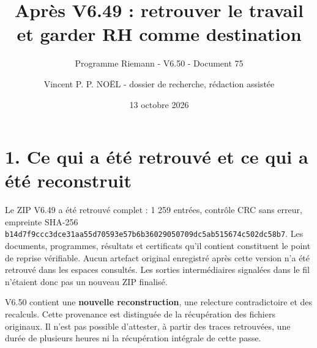 \documentclass[
  10pt,
  a4paper,
]{article}
\title{Après V6.49 : retrouver le travail et garder RH comme
destination}
\subtitle{Programme Riemann - V6.50 - Document 75}
\author{Vincent P. P. NOËL - dossier de recherche, rédaction assistée}
\date{13 octobre 2026}
\begin{document}
\maketitle

{
\setcounter{tocdepth}{2}
\tableofcontents
}
\hypertarget{ce-qui-a-uxe9tuxe9-retrouvuxe9-et-ce-qui-a-uxe9tuxe9-reconstruit}{%
\section{1. Ce qui a été retrouvé et ce qui a été
reconstruit}\label{ce-qui-a-uxe9tuxe9-retrouvuxe9-et-ce-qui-a-uxe9tuxe9-reconstruit}}

Le ZIP V6.49 a été retrouvé complet : 1 259 entrées, contrôle CRC sans
erreur, empreinte SHA-256
\texttt{b14d7f9ccc3dce31aa55d70593e57b6b36029050709dc5ab515674c502dc58b7}.
Les documents, programmes, résultats et certificats qu'il contient
constituent le point de reprise vérifiable. Aucun artefact original
enregistré après cette version n'a été retrouvé dans les espaces
consultés. Les sorties intermédiaires signalées dans le fil n'étaient
donc pas un nouveau ZIP finalisé.

V6.50 contient une \textbf{nouvelle reconstruction}, une relecture
contradictoire et des recalculs. Cette provenance est distinguée de la
récupération des fichiers originaux. Il n'est pas possible d'attester, à
partir des traces retrouvées, une durée de plusieurs heures ni la
récupération intégrale de cette passe.
\end{document}
